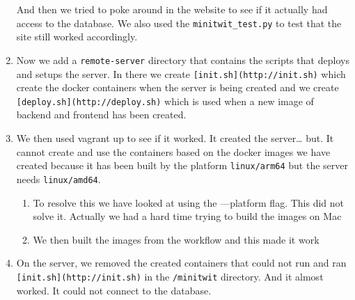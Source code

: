 \begin{enumerate}
    And then we tried to poke around in the website to see if it actually   had access to the database. We also used the \texttt{minitwit\_test.py} to test that the site still worked accordingly.
    \item Now we add a \texttt{remote-server} directory that contains the scripts that deploys and setups the server. In there we create \texttt{{[}init.sh{]}(http://init.sh)} which create the docker containers when the server is being created and we create \texttt{{[}deploy.sh{]}(http://deploy.sh)} which is used when a new image of backend and frontend has been created.
    \item We then used vagrant up to see if it worked. It created the server\ldots{} but. It cannot create and use the containers based on the docker images we have created because it has been built by the platform \texttt{linux/arm64} but the server needs \texttt{linux/amd64}.

    \begin{enumerate}
        \item To resolve this we have looked at using the ---platform flag. This did not solve it. Actually we had a hard time trying to build the images on Mac
        \item We then built the images from the workflow and this made it work
    \end{enumerate}
    \item On the server, we removed the created containers that could not run and ran \texttt{{[}init.sh{]}(http://init.sh)} in the \texttt{/minitwit} directory. And it almost worked. It could not connect to the database.


\end{enumerate}
